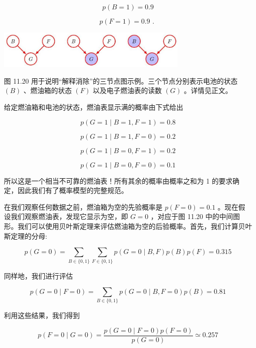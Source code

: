 \documentclass[10pt]{report}
\begin{document}
\[
p\left( {B = 1}\right)  = {0.9}
\]

\[
p\left( {F = 1}\right)  = {0.9}\text{ . }
\]

\begin{center}
\includegraphics[max width=0.7\textwidth]{images/0194e279-9b28-703a-88f4-c3ac21e2010d_360_583_1669_899_179_0.jpg}
\end{center}
\hspace*{3em} 

图 11.20 用于说明“解释消除”的三节点图示例。三个节点分别表示电池的状态 \(\left( B\right)\) 、燃油箱的状态 \(\left( F\right)\) 以及电子燃油表的读数 \(\left( G\right)\) 。详情见正文。

给定燃油箱和电池的状态，燃油表显示满的概率由下式给出

\[
p\left( {G = 1 \mid  B = 1,F = 1}\right)  = {0.8}
\]

\[
p\left( {G = 1 \mid  B = 1,F = 0}\right)  = {0.2}
\]

\[
p\left( {G = 1 \mid  B = 0,F = 1}\right)  = {0.2}
\]

\[
p\left( {G = 1 \mid  B = 0,F = 0}\right)  = {0.1}
\]

所以这是一个相当不可靠的燃油表！所有其余的概率由概率之和为 1 的要求确定，因此我们有了概率模型的完整规范。

在我们观察任何数据之前，燃油箱为空的先验概率是 \(p\left( {F = 0}\right)  = {0.1}\) 。现在假设我们观察燃油表，发现它显示为空，即 \(G = 0\) ，对应于图 11.20 中的中间图形。我们可以使用贝叶斯定理来评估燃油箱为空的后验概率。首先，我们计算贝叶斯定理的分母:

\[
p\left( {G = 0}\right)  = \mathop{\sum }\limits_{{B \in  \{ 0,1\} }}\mathop{\sum }\limits_{{F \in  \{ 0,1\} }}p\left( {G = 0 \mid  B,F}\right) p\left( B\right) p\left( F\right)  = {0.315} \tag{11.32}
\]

同样地，我们进行评估

\[
p\left( {G = 0 \mid  F = 0}\right)  = \mathop{\sum }\limits_{{B \in  \{ 0,1\} }}p\left( {G = 0 \mid  B,F = 0}\right) p\left( B\right)  = {0.81} \tag{11.33}
\]

利用这些结果，我们得到

\[
p\left( {F = 0 \mid  G = 0}\right)  = \frac{p\left( {G = 0 \mid  F = 0}\right) p\left( {F = 0}\right) }{p\left( {G = 0}\right) } \simeq  {0.257} \tag{11.34}
\]
\end{document}
